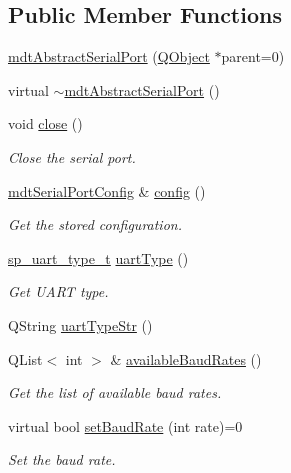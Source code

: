 \subsection*{Public Member Functions}
\begin{DoxyCompactItemize}
\item 
\hyperlink{classmdt_abstract_serial_port_ae379b6151edebc1518e81ec061e379db}{mdt\-Abstract\-Serial\-Port} (\hyperlink{class_q_object}{Q\-Object} $\ast$parent=0)
\item 
virtual \hyperlink{classmdt_abstract_serial_port_af695a8df8e155a938da8e7bd00e34631}{$\sim$mdt\-Abstract\-Serial\-Port} ()
\item 
void \hyperlink{classmdt_abstract_serial_port_ae668910f98ad0e158dc6ebebf0c19805}{close} ()
\begin{DoxyCompactList}\small\item\em Close the serial port. \end{DoxyCompactList}\item 
\hyperlink{classmdt_serial_port_config}{mdt\-Serial\-Port\-Config} \& \hyperlink{classmdt_abstract_serial_port_ae053b73fee897769641813df658c9ead}{config} ()
\begin{DoxyCompactList}\small\item\em Get the stored configuration. \end{DoxyCompactList}\item 
\hyperlink{classmdt_abstract_serial_port_a56b107c57fb0acb17cfcca262abe6a54}{sp\-\_\-uart\-\_\-type\-\_\-t} \hyperlink{classmdt_abstract_serial_port_a6b153155d9e110336d51ec48d2cee203}{uart\-Type} ()
\begin{DoxyCompactList}\small\item\em Get U\-A\-R\-T type. \end{DoxyCompactList}\item 
Q\-String \hyperlink{classmdt_abstract_serial_port_a669c9ce68455abd3cfdb98259996e701}{uart\-Type\-Str} ()
\item 
Q\-List$<$ int $>$ \& \hyperlink{classmdt_abstract_serial_port_aecd76bff0f93cb86c3bbfd73e3776032}{available\-Baud\-Rates} ()
\begin{DoxyCompactList}\small\item\em Get the list of available baud rates. \end{DoxyCompactList}\item 
virtual bool \hyperlink{classmdt_abstract_serial_port_ae250b30c1db5652bd2abe2caf1c9d5c7}{set\-Baud\-Rate} (int rate)=0
\begin{DoxyCompactList}\small\item\em Set the baud rate. \end{DoxyCompactList}\item 

\end{DoxyCompactItemize}
